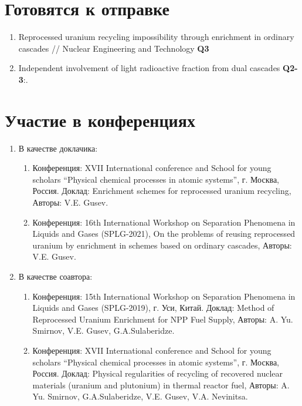 \section{Готовятся к отправке}
\begin{enumerate}
    \item Reprocessed uranium recycling impossibility through enrichment in ordinary cascades // Nuclear Engineering and Technology \textbf{Q3}
    \item Independent involvement of light radioactive fraction from dual cascades \textbf{Q2-3}:.
\end{enumerate}

\section{Участие в конференциях}
\begin{enumerate}
    \item В качестве доклачика:
    \begin{enumerate}
        \item Конференция:  XVII International conference and School for young scholars “Physical chemical processes in atomic systems”, г. Москва, Россия. Доклад: Enrichment schemes for reprocessed uranium recycling, Авторы: V.E. Gusev.
        \item Конференция:  16th International Workshop on Separation Phenomena in Liquids and Gases (SPLG-2021), On the problems of reusing reprocessed uranium by enrichment in schemes based on ordinary cascades, Авторы: V.E. Gusev.
    \end{enumerate}
    \item В качестве соавтора:
    \begin{enumerate}
        \item Конференция:  15th International Workshop on Separation Phenomena in Liquids and Gases (SPLG-2019), г. Уси, Китай. Доклад: Method of Reprocessed Uranium Enrichment for NPP Fuel Supply, Авторы: A. Yu. Smirnov, V.E. Gusev, G.A.Sulaberidze.
        \item Конференция:  XVII International conference and School for young scholars “Physical chemical processes in atomic systems”, г. Москва, Россия. Доклад: Physical regularities of recycling of recovered nuclear materials (uranium         and plutonium) in thermal reactor fuel, Авторы: A. Yu. Smirnov, G.A.Sulaberidze, V.E. Gusev, V.A. Nevinitsa.
    \end{enumerate}
\end{enumerate}
